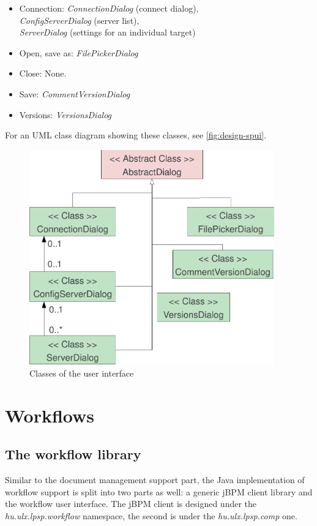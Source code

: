 \begin{itemize}
\item Connection: \emph{ConnectionDialog} (connect dialog), \\
\emph{ConfigServerDialog} (server list), \\ \emph{ServerDialog} (settings for an
individual target)
\item Open, save as: \emph{FilePickerDialog}
\item Close: None.
\item Save: \emph{CommentVersionDialog}
\item Versions: \emph{VersionsDialog}
\end{itemize}

For an UML class diagram showing these classes, see \autoref{fig:design-spui}.

\begin{figure}[p]
\centering
\includegraphics[width=400px,keepaspectratio]{design-spui.pdf}
\caption{Classes of the user interface}
\label{fig:design-spui}
\end{figure}

\section{Workflows}

\subsection{The workflow library}

Similar to the document management support part, the Java implementation of
workflow support is split into two parts as well: a generic jBPM client library
and the workflow user interface. The jBPM client is designed under the
\emph{hu.ulx.lpsp.workflow} namespace, the second is under the
\emph{hu.ulx.lpsp.comp} one.

